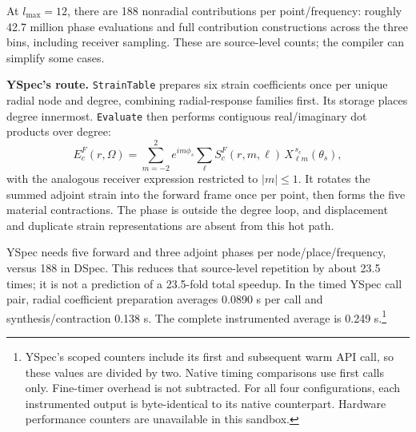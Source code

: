 \documentclass[11pt,a4paper]{article}
\begin{document}
At $l_{\max}=12$, there are 188 nonradial contributions per point/frequency: roughly 42.7 million phase evaluations and full contribution constructions across the three bins, including receiver sampling. These are source-level counts; the compiler can simplify some cases.

\textbf{YSpec's route.} \texttt{StrainTable} prepares six strain coefficients once per unique radial node and degree, combining radial-response families first. Its storage places degree innermost. \texttt{Evaluate} then performs contiguous real/imaginary dot products over degree:
\begin{equation}
E_c^{F}(r,\Omega)
 = \sum_{m=-2}^{2} e^{im\phi_s}
   \sum_{\ell} S_c^{F}(r,m,\ell)\,
   X_{\ell m}^{\,s_c}(\theta_s),
\end{equation}
with the analogous receiver expression restricted to $|m|\leq1$. It rotates the summed adjoint strain into the forward frame once per point, then forms the five material contractions. The phase is outside the degree loop, and displacement and duplicate strain representations are absent from this hot path.

YSpec needs five forward and three adjoint phases per node/place/frequency, versus 188 in DSpec. This reduces that source-level repetition by about 23.5 times; it is not a prediction of a 23.5-fold total speedup. In the timed YSpec call pair, radial coefficient preparation averages 0.0890 s per call and synthesis/contraction 0.138 s. The complete instrumented average is 0.249 s.\footnote{YSpec's scoped counters include its first and subsequent warm API call, so these values are divided by two. Native timing comparisons use first calls only. Fine-timer overhead is not subtracted. For all four configurations, each instrumented output is byte-identical to its native counterpart. Hardware performance counters are unavailable in this sandbox.}
\end{document}
